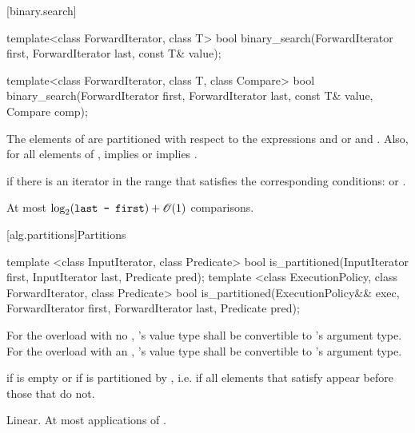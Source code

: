 [binary.search]{}

%
\begin{itemdecl}
template<class ForwardIterator, class T>
  bool binary_search(ForwardIterator first, ForwardIterator last,
                     const T& value);

template<class ForwardIterator, class T, class Compare>
  bool binary_search(ForwardIterator first, ForwardIterator last,
                     const T& value, Compare comp);
\end{itemdecl}

\begin{itemdescr}
\pnum
\requires
The elements
of
are partitioned with respect to the expressions
and
or
and
.
Also, for all elements
of
\tcode{[first, last)},
implies
or
implies
.

\pnum
\returns
{}
if there is an iterator
in the range
that satisfies the corresponding conditions:
or
.

\pnum
\complexity
At most
$\log_2(\texttt{last - first}) + \mathscr{O}(1)$
comparisons.
\end{itemdescr}

[alg.partitions]{Partitions}

%
\begin{itemdecl}
template <class InputIterator, class Predicate>
  bool is_partitioned(InputIterator first, InputIterator last, Predicate pred);
template <class ExecutionPolicy, class ForwardIterator, class Predicate>
  bool is_partitioned(ExecutionPolicy&& exec,
                      ForwardIterator first, ForwardIterator last, Predicate pred);
\end{itemdecl}

\begin{itemdescr}
\pnum
\requires For the overload with no ,
's value type shall be convertible to 's
argument type.  For the overload with an ,
's value type shall be convertible to 's
argument type.

\pnum
\returns {} if
 is empty or if
 is partitioned by , i.e. if all elements that satisfy  appear before those that do not.

\pnum
\complexity Linear. At most  applications of .
\end{itemdescr}

